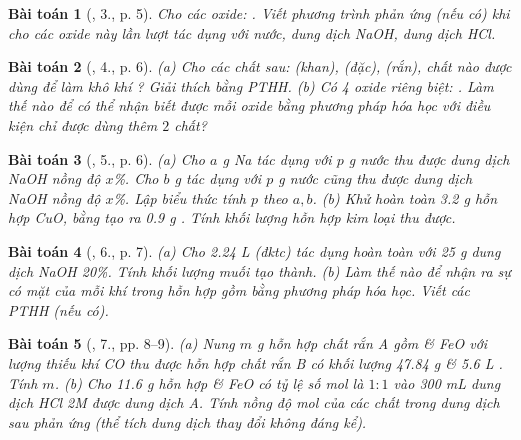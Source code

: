 \documentclass{article}
\newtheorem{baitoan}{Bài toán}
\begin{document}
\begin{baitoan}[\cite{An_350_BT_Hoa_Hoc_9}, 3., p. 5]
	Cho các oxide: \emph{}. Viết phương trình phản ứng (nếu có) khi cho các oxide này lần lượt tác dụng với nước, dung dịch \emph{NaOH}, dung dịch \emph{HCl}.
\end{baitoan}

\begin{baitoan}[\cite{An_350_BT_Hoa_Hoc_9}, 4., p. 6]
	(a) Cho các chất sau: \emph{ (khan),  (đặc),  (rắn)}, chất nào được dùng để làm khô khí \emph{}? Giải thích bằng PTHH. (b) Có 4 oxide riêng biệt: \emph{}. Làm thế nào để có thể nhận biết được mỗi oxide bằng phương pháp hóa học với điều kiện chỉ được dùng thêm $2$ chất? 
\end{baitoan}

\begin{baitoan}[\cite{An_350_BT_Hoa_Hoc_9}, 5., p. 6]
	(a) Cho $a$ \emph{g Na} tác dụng với $p$ \emph{g} nước thu được dung dịch \emph{NaOH} nồng độ $x$\%. Cho $b$ \emph{g } tác dụng với $p$ \emph{g} nước cũng thu được dung dịch \emph{NaOH} nồng độ $x$\%. Lập biểu thức tính $p$ theo $a,b$. (b) Khử hoàn toàn \emph{3.2 g} hỗn hợp \emph{CuO, } bằng \emph{} tạo ra \emph{0.9 g }. Tính khối lượng hỗn hợp kim loại thu được.
\end{baitoan}

\begin{baitoan}[\cite{An_350_BT_Hoa_Hoc_9}, 6., p. 7]
	(a) Cho \emph{2.24 L } (đktc) tác dụng hoàn toàn với \emph{25 g} dung dịch \emph{NaOH 20\%}. Tính khối lượng muối tạo thành. (b) Làm thế nào để nhận ra sự có mặt của mỗi khí trong hỗn hợp gồm \emph{} bằng phương pháp hóa học. Viết các PTHH (nếu có).
\end{baitoan}

\begin{baitoan}[\cite{An_350_BT_Hoa_Hoc_9}, 7., pp. 8--9]
	(a) Nung $m$ \emph{g} hỗn hợp chất rắn A gồm \emph{} \& \emph{FeO} với lượng thiếu khí \emph{CO} thu được hỗn hợp chất rắn B có khối lượng \emph{47.84 g} \& \emph{5.6 L }. Tính $m$. (b) Cho \emph{11.6 g} hỗn hợp \emph{} \& \emph{FeO} có tỷ lệ số mol là $1:1$ vào \emph{300 mL} dung dịch \emph{HCl 2M} được dung dịch A. Tính nồng độ mol của các chất trong dung dịch sau phản ứng (thể tích dung dịch thay đổi không đáng kể).
\end{baitoan}
\end{document}
